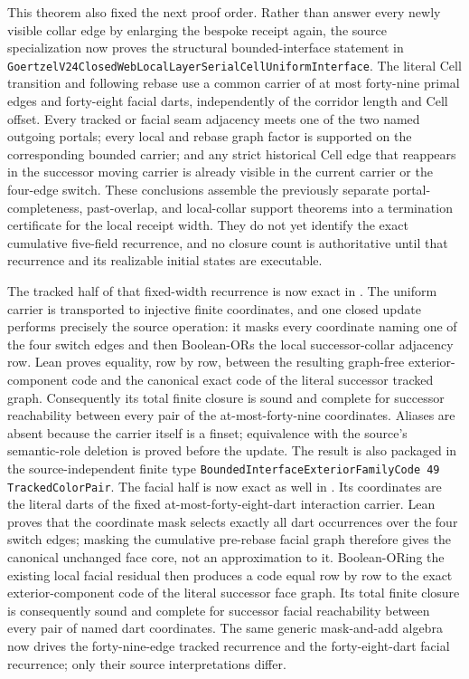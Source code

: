 \documentclass[11pt]{article}
\theoremstyle{definition}
\begin{document}
This theorem also fixed the next proof order.  Rather than answer every newly
visible collar edge by enlarging the bespoke receipt again, the source
specialization now proves the structural bounded-interface statement in
\texttt{GoertzelV24ClosedWebLocalLayerSerialCellUniformInterface}.  The literal
Cell transition and following rebase use a common carrier of at most
forty-nine primal edges and forty-eight facial darts, independently of the
corridor length and Cell offset.  Every tracked or facial seam adjacency meets
one of the two named outgoing portals; every local and rebase graph factor is
supported on the corresponding bounded carrier; and any strict historical
Cell edge that reappears in the successor moving carrier is already visible
in the current carrier or the four-edge switch.  These conclusions assemble
the previously separate portal-completeness, past-overlap, and local-collar
support theorems into a termination certificate for the local receipt width.
They do not yet identify the exact cumulative five-field recurrence, and no
closure count is authoritative until that recurrence and its realizable
initial states are executable.

The tracked half of that fixed-width recurrence is now exact in
.
The uniform carrier is transported to injective finite coordinates, and one
closed update performs precisely the source operation: it masks every
coordinate naming one of the four switch edges and then Boolean-ORs the local
successor-collar adjacency row.  Lean proves equality, row by row, between the
resulting graph-free exterior-component code and the canonical exact code of
the literal successor tracked graph.  Consequently its total finite closure
is sound and complete for successor reachability between every pair of the
at-most-forty-nine coordinates.  Aliases are absent because the carrier itself
is a finset; equivalence with the source's semantic-role deletion is proved
before the update.  The result is also packaged in the source-independent
finite type \texttt{BoundedInterfaceExteriorFamilyCode 49 TrackedColorPair}.
The facial half is now exact as well in
.
Its coordinates are the literal darts of the fixed at-most-forty-eight-dart
interaction carrier.  Lean proves that the coordinate mask selects exactly
all dart occurrences over the four switch edges; masking the cumulative
pre-rebase facial graph therefore gives the canonical unchanged face core,
not an approximation to it.  Boolean-ORing the existing local facial residual
then produces a code equal row by row to the exact exterior-component code of
the literal successor face graph.  Its total finite closure is consequently
sound and complete for successor facial reachability between every pair of
named dart coordinates.  The same generic mask-and-add algebra now drives the
forty-nine-edge tracked recurrence and the forty-eight-dart facial recurrence;
only their source interpretations differ.
\end{document}
